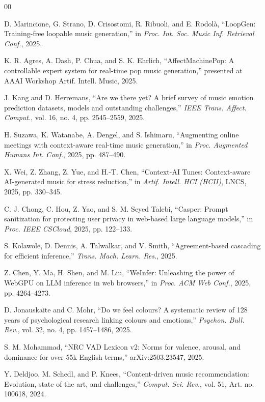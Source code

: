 \documentclass[conference]{IEEEtran}
\begin{document}
\scriptsize
\begin{thebibliography}{00}

 D. Marincione, G. Strano, D. Crisostomi, R. Ribuoli, and E. Rodol\`a, ``LoopGen: Training-free loopable music generation,'' in \emph{Proc. Int. Soc. Music Inf. Retrieval Conf.}, 2025.

 K. R. Agres, A. Dash, P. Chua, and S. K. Ehrlich, ``AffectMachinePop: A controllable expert system for real-time pop music generation,'' presented at AAAI Workshop Artif. Intell. Music, 2025.

 J. Kang and D. Herremans, ``Are we there yet? A brief survey of music emotion prediction datasets, models and outstanding challenges,'' \emph{IEEE Trans. Affect. Comput.}, vol. 16, no. 4, pp. 2545--2559, 2025.

 H. Suzawa, K. Watanabe, A. Dengel, and S. Ishimaru, ``Augmenting online meetings with context-aware real-time music generation,'' in \emph{Proc. Augmented Humans Int. Conf.}, 2025, pp. 487--490.

 X. Wei, Z. Zhang, Z. Yue, and H.-T. Chen, ``Context-AI Tunes: Context-aware AI-generated music for stress reduction,'' in \emph{Artif. Intell. HCI (HCII)}, LNCS, 2025, pp. 330--345.

 C. J. Chong, C. Hou, Z. Yao, and S. M. Seyed Talebi, ``Casper: Prompt sanitization for protecting user privacy in web-based large language models,'' in \emph{Proc. IEEE CSCloud}, 2025, pp. 122--133.

 S. Kolawole, D. Dennis, A. Talwalkar, and V. Smith, ``Agreement-based cascading for efficient inference,'' \emph{Trans. Mach. Learn. Res.}, 2025.

 Z. Chen, Y. Ma, H. Shen, and M. Liu, ``WeInfer: Unleashing the power of WebGPU on LLM inference in web browsers,'' in \emph{Proc. ACM Web Conf.}, 2025, pp. 4264--4273.

 D. Jonauskaite and C. Mohr, ``Do we feel colours? A systematic review of 128 years of psychological research linking colours and emotions,'' \emph{Psychon. Bull. Rev.}, vol. 32, no. 4, pp. 1457--1486, 2025.

 S. M. Mohammad, ``NRC VAD Lexicon v2: Norms for valence, arousal, and dominance for over 55k English terms,'' arXiv:2503.23547, 2025.

 Y. Deldjoo, M. Schedl, and P. Knees, ``Content-driven music recommendation: Evolution, state of the art, and challenges,'' \emph{Comput. Sci. Rev.}, vol. 51, Art. no. 100618, 2024.


\end{thebibliography}
\end{document}
